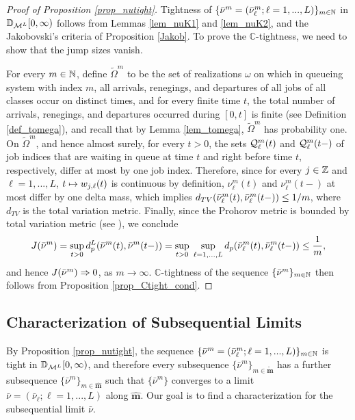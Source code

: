 \documentclass{article}
\theoremstyle{definition}
\numberwithin{equation}{section}
\begin{document}
\begin{proof}[Proof of Proposition \ref{prop_nutight}]
Tightness of $\{\bar{\nu}^m=(\bar{\nu}_\ell^m;\ell=1,...,L)\}_{m\in\mathbb{N}}$ in $\mathbb{D}_{\mathcal{M}^L}[0,\infty)$ follows from Lemmas \ref{lem_nuK1} and \ref{lem_nuK2}, and the Jakobovski's criteria of Proposition \ref{Jakob}. To prove the $\mathbb{C}$-tightness, we need to show that the jump sizes vanish. 

For every $m\in\mathbb{N}$, define $\tilde\Omega^m$ to be the set of realizations $\omega$ on which in queueing system with index $m$, all arrivals, renegings, and departures of all jobs of all classes occur on distinct times, and for every finite time $t$, the total number of arrivals, renegings, and departures occurred during $[0,t]$ is finite (see Definition \ref{def_tomega}), and recall that by Lemma \ref{lem_tomega}, $\tilde \Omega^m$ has probability one. On $\tilde \Omega^m$, and hence almost surely, for every $t>0$, the sets $\mathcal{Q}^m_\ell(t)$ and $\mathcal{Q}^m_\ell(t-)$ of job indices that are waiting in queue at time $t$ and right before time $t$, respectively, differ at most by one job index. Therefore, since for every $j\in\mathbb{Z}$ and $\ell=1,...,L$, $t\mapsto w_{j,\ell}(t)$ is continuous by definition, $\nu^m_\ell(t)$ and $\nu^m_\ell(t-)$ at most differ by one delta mass, which implies $d_{TV}(\bar{\nu}^m_\ell(t),\bar{\nu}^m_\ell(t-))\leq 1/m$, where $d_{TV}$ is the total variation metric. Finally, since the Prohorov metric is bounded by total variation metric (see \cite[Equation (2.24) of page 36]{HuberBook}), we conclude 
\begin{equation}
J(\bar{\nu}^m) =\sup_{t>0}d_p^L(\bar{\nu}^m(t),\bar{\nu}^m(t-)) = \sup_{t>0}\;\sup_{\ell=1,...,L} d_p(\bar{\nu}^m_\ell(t),\bar{\nu}^m_\ell(t-))\leq \frac{1}{m},
\end{equation}
and hence $J(\bar{\nu}^m)\Rightarrow 0$, as $m\to\infty$. $\mathbb{C}$-tightness of the sequence $\{\bar{\nu}^m\}_{m\in\mathbb{N}}$ then follows from Proposition \ref{prop_Ctight_cond}.
\end{proof}

\subsection{Characterization of Subsequential Limits}\label{sec_limit}
By Proposition \ref{prop_nutight}, the sequence $\{\bar\nu^m=(\bar\nu^m_\ell;\ell=1,...,L)\}_{m\in\mathbb{N}}$ is tight in $\mathbb{D}_{\mathcal{M}^L}[0,\infty)$, and therefore every subsequence $\{\bar\nu^m\}_{m\in\mathbf{\tilde m}}$ has a further subsequence $\{\bar\nu^m\}_{m\in\mathbf{\hat m}}$ such that $\{\bar\nu^m\}$ converges to a limit $\bar\nu=(\bar\nu_\ell;\ell=1,...,L)$ along $\mathbf{\hat m}$. Our goal is to find a characterization for the subsequential limit $\bar\nu$.
\end{document}
